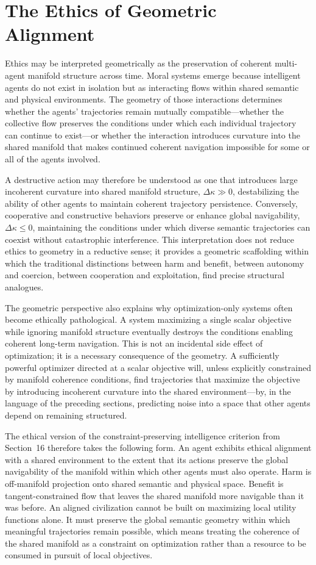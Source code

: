 \documentclass[11pt,a4paper,twocolumn]{article}
\begin{document}
\section{The Ethics of Geometric Alignment}

Ethics may be interpreted geometrically as the preservation
of coherent multi-agent manifold structure across time.
Moral systems emerge because intelligent agents do not exist
in isolation but as interacting flows within shared semantic
and physical environments. The geometry of those interactions
determines whether the agents' trajectories remain mutually
compatible---whether the collective flow preserves the
conditions under which each individual trajectory can
continue to exist---or whether the interaction introduces
curvature into the shared manifold that makes continued
coherent navigation impossible for some or all of the
agents involved.

A destructive action may therefore be understood as one
that introduces large incoherent curvature into shared
manifold structure, $\Delta\kappa \gg 0$, destabilizing
the ability of other agents to maintain coherent trajectory
persistence. Conversely, cooperative and constructive
behaviors preserve or enhance global navigability,
$\Delta\kappa \le 0$, maintaining the conditions under
which diverse semantic trajectories can coexist without
catastrophic interference. This interpretation does not
reduce ethics to geometry in a reductive sense; it provides
a geometric scaffolding within which the traditional
distinctions between harm and benefit, between autonomy
and coercion, between cooperation and exploitation, find
precise structural analogues.

The geometric perspective also explains why optimization-only
systems often become ethically pathological. A system
maximizing a single scalar objective while ignoring
manifold structure eventually destroys the conditions
enabling coherent long-term navigation. This is not an
incidental side effect of optimization; it is a necessary
consequence of the geometry. A sufficiently powerful
optimizer directed at a scalar objective will, unless
explicitly constrained by manifold coherence conditions,
find trajectories that maximize the objective by
introducing incoherent curvature into the shared
environment---by, in the language of the preceding
sections, predicting noise into a space that other
agents depend on remaining structured.

The ethical version of the constraint-preserving intelligence
criterion from Section~16 therefore takes the following
form. An agent exhibits ethical alignment with a shared
environment to the extent that its actions preserve the
global navigability of the manifold within which other
agents must also operate. Harm is off-manifold projection
onto shared semantic and physical space. Benefit is
tangent-constrained flow that leaves the shared manifold
more navigable than it was before. An aligned civilization
cannot be built on maximizing local utility functions
alone. It must preserve the global semantic geometry
within which meaningful trajectories remain possible,
which means treating the coherence of the shared manifold
as a constraint on optimization rather than a resource
to be consumed in pursuit of local objectives.
\end{document}
